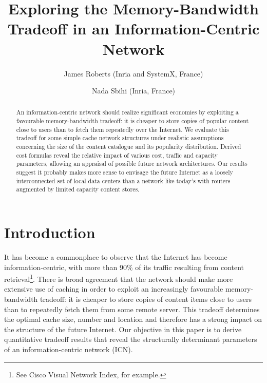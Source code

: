\documentclass [11pt]{article}
\begin{document}
\title{Exploring the Memory-Bandwidth Tradeoff in an Information-Centric Network}


\author{
{James Roberts (Inria and SystemX, France)}
\and
{Nada Sbihi (Inria, France)}
}

\date{}

\maketitle    


\begin{abstract}
An information-centric network should realize significant economies by exploiting a favourable memory-bandwidth tradeoff: it is cheaper to store copies of popular content close to users than to fetch them repeatedly over the Internet. We evaluate this tradeoff for some simple cache network structures under realistic assumptions concerning the size of the content catalogue and its popularity distribution. Derived cost formulas reveal the relative impact of various cost, traffic and capacity parameters, allowing an appraisal of possible future network architectures. Our results suggest it probably makes more sense to envisage the future Internet as a loosely interconnected set of local data centers than a network like today's with routers augmented by limited capacity content stores.
\end{abstract}





\section{Introduction}
It has become a commonplace to observe that the Internet has become information-centric, with more than 90\% of its traffic resulting from content retrieval\footnote{See Cisco Visual Network Index, for example.}. There is broad agreement that the network should make more extensive use of caching in order to exploit an increasingly favourable memory-bandwidth tradeoff: it is cheaper to store copies of content items close to users than to repeatedly fetch them from some remote server. This tradeoff determines the optimal cache size, number and location and therefore has a strong impact on the structure of the future Internet. Our objective in this paper is to derive quantitative tradeoff results that reveal the structurally determinant parameters of an information-centric network (ICN).
\end{document}
